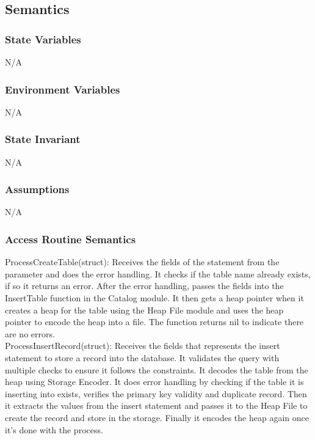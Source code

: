 \documentclass[12pt]{article}
\begin{document}
\subsection {Semantics}

\subsubsection {State Variables}

N/A

\subsubsection {Environment Variables}
N/A

\subsubsection {State Invariant}
N/A

\subsubsection {Assumptions}
N/A


\subsubsection {Access Routine Semantics}

\noindent ProcessCreateTable({\color{red}struct}): Receives the fields of the statement from the parameter and does the error handling. It checks if the table name already exists, if so it returns an error. After the error handling, passes the fields into the InsertTable function in the Catalog module. It then gets a heap pointer when it creates a heap for the table using the Heap File module and uses the heap pointer to encode the heap into a file. The function returns nil to indicate there are no errors. \\

\noindent ProcessInsertRecord({\color{red}struct}): Receives the fields that represents the insert statement to store a record into the database. It validates the query with multiple checks to ensure it follows the constraints. It decodes the table from the heap using Storage Encoder. It does error handling by checking if the table it is inserting into exists, verifies the primary key validity and duplicate record. Then it extracts the values from the insert statement and passes it to the Heap File to create the record and store in the storage. Finally it encodes the heap again once it's done with the process. \\
\end{document}
